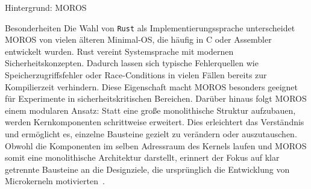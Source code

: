 \begin{section}{Hintergrund: MOROS}
\begin{subsection}{Besonderheiten}
Die Wahl von \texttt{Rust} als Implementierungssprache unterscheidet MOROS von vielen älteren Minimal-OS, die häufig in C oder Assembler entwickelt wurden.
Rust vereint Systemsprache mit modernen Sicherheitskonzepten.
Dadurch lassen sich typische Fehlerquellen wie Speicherzugriffsfehler oder
Race-Conditions in vielen Fällen bereits zur Kompilierzeit verhindern.
Diese Eigenschaft macht MOROS besonders geeignet für Experimente in sicherheitskritischen Bereichen.
Darüber hinaus folgt MOROS einem modularen Ansatz: Statt eine große monolithische Struktur aufzubauen, werden Kernkomponenten schrittweise erweitert.
Dies erleichtert das Verständnis und ermöglicht es, einzelne Bausteine gezielt zu verändern oder auszutauschen. Obwohl die Komponenten im selben Adressraum des Kernels laufen und MOROS somit eine monolithische Architektur darstellt, erinnert der Fokus auf klar getrennte Bausteine an die Designziele, die ursprünglich die Entwicklung von Microkerneln motivierten~\cite{tanenbaum1992linux}.
\end{subsection}

\end{section}